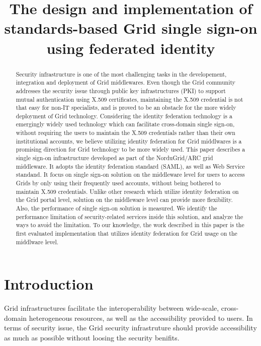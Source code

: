 \documentclass[conference]{IEEEtran}
\begin{document}
\title{The design and implementation of standards-based Grid single sign-on using federated identity}

\author{
}

\maketitle


\begin{abstract}
Security infrastructure is one of the most challenging tasks in the developement, integration and
deployment of Grid middlewares. Even though the Grid community addresses the security issue 
through public key infrastructures (PKI) to support mutual authentication using X.509 certificates,
maintaining the X.509 credential is not that easy for non-IT specialists, and is proved to be an 
obstacle for the more widely deployment of Grid technology. Considering the identity federation 
technology is a emergingly widely used technology which can facilitate cross-domain single sign-on,
without requiring the users to maintain the X.509 credentials rather than their own institutional
accounts, we believe utilizing identity federation for Grid middlwares is a promising direction 
for Grid technology to be more widely used.
This paper describes a single sign-on infrastructure developed as part of the NorduGrid/ARC grid 
middleware. It adopts the identity federation standard (SAML), as well as Web Service standand. 
It focus on single sign-on solution on the middleware level for users to access Grids by only 
using their frequently used accounts, without being bothered to maintain X.509 credentials. 
Unlike other research which utilize identity federation on the Grid portal level, solution on
the middleware level can provide more flexibility.
Also, the performance of single sign-on solution is measured. We identify the performance limitation 
of security-related services inside this solution, and analyze the ways to avoid the limitation.
To our knowledge, the work described in this paper is the first evaluated implementation that utilizes 
identity federation for Grid usage on the middlware level.
\end{abstract}

\section{Introduction}
\label{sec:intro}
Grid infrastructures facilitate the interoperability between wide-scale, cross-domain heterogeneous 
resources, as well as the accessibility provided to users. In terms of security issue, the Grid security 
infrastruture should provide accessibility as much as possible without loosing the security benifits.
\end{document}
